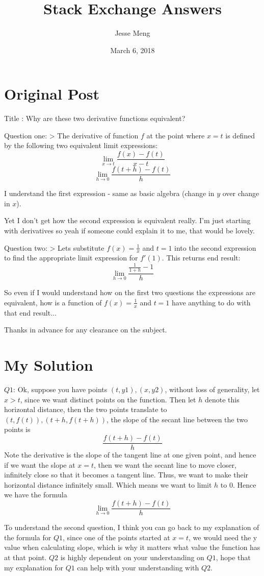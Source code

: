 \documentclass{article}
\title{Stack Exchange Answers}
\author{Jesse Meng }
\date{March 6, 2018}
\begin{document}
\maketitle

\section{Original Post}
Title : Why are these two derivative functions equivalent?

Question one:
> The derivative of function $f$ at the point where $x=t$ is defined by the following two equivalent limit expressions:
$$\lim_{x\to t} \frac{f(x)-f(t)}{x-t}$$
$$\lim_{h\to0} \frac{f(t+h)-f(t)}{h}$$

I understand the first expression - same as basic algebra (change in $y$ over change in $x$).

Yet I don't get how the second expression is equivalent really. I'm just starting with derivatives so yeah if someone could explain it to me, that would be lovely.

Question two:
> Lets substitute $f(x)=\frac{1}{x}$ and $t=1$ into the second expression to find the appropriate limit expression for $f'(1)$.
This returns end result:
$$\lim_{h\to0} \frac{\frac{1}{1+h}-1}{h}$$

So even if I would understand how on the first two questions the expressions are equivalent, how is a function of $f(x)=\frac{1}{x}$ and $t=1$ have anything to do with that end result...

Thanks in advance for any clearance on the subject.
\section{My Solution}
$Q1$: Ok, suppose you have points $(t, y1), (x,y2)$, without loss of generality, let $x>t$, since we want distinct points on the function. Then let $h$ denote this horizontal distance, then the two points translate to $(t, f(t)), (t+h,f(t+h))$, the slope of the secant line between the two points is $$ \frac{f(t+h)-f(t)}{h}$$Note the derivative is the slope of the tangent line at one given point, and hence if we want the slope at $x=t$, then we want the secant line to move closer, infinitely close so that it becomes  a tangent line. Thus, we want to make their horizontal distance infinitely small. Which means we want to limit $h$ to $0$. Hence we have the formula $$\lim_{h\to0} \frac{f(t+h)-f(t)}{h}$$

To understand the second question, I think you can go back to my explanation of the formula for $Q1$, since one of the points started at $x=t$, we would need the y value when calculating slope, which is why it matters what value the function has at that point. $Q2$ is highly dependent on your understanding on $Q1$, hope that my explanation for $Q1$ can help with your understanding with $Q2$.
\end{document}
